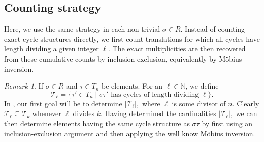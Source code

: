 \documentclass[12pt]{article}
\theoremstyle{definition}
\theoremstyle{remark}
\newtheorem{remark}[theorem]{Remark}
\begin{document}
\subsection{Counting strategy}
Here, we use the same strategy in each non-trivial $\sigma\in R$.
Instead of counting exact cycle structures directly, we first count translations for which all cycles have length dividing a given integer $\ell$.
The exact multiplicities are then recovered from these cumulative counts by inclusion-exclusion, equivalently by Möbius inversion.
\begin{remark}
  If $\sigma\in R$ and $\tau\in T_n$ be elements. For an $\ell\in \mathbb{N}$, we define \[\mathcal{T}_\ell = \{ \tau'\in T_n \mid \sigma\tau' \textrm{ has cycles of length dividing } \ell \}.\]
 In , our first goal will be to determine
$\vert \mathcal{T}_\ell\vert ,$ where $\ell$ is some divisor of $n.$
Clearly $\mathcal{T}_\ell \subseteq \mathcal{T}_k$ whenever $\ell$ divides $k$.
Having determined the cardinalities $\vert \mathcal{T}_\ell\vert ,$ we can then determine elements having the same cycle structure as $\sigma\tau$ by first using an inclusion-exclusion argument and then applying the well know Möbius inversion.
\end{remark}
\end{document}
